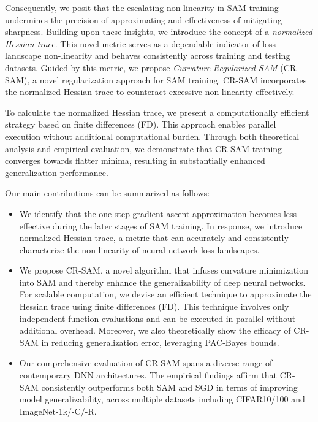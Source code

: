 \documentclass[letterpaper]{article} %
\theoremstyle{plain}
\theoremstyle{definition}
\begin{document}
Consequently, we posit that the escalating non-linearity in SAM training undermines the precision of approximating and effectiveness of mitigating sharpness. Building upon these insights, we introduce the concept of a {\em normalized Hessian trace}. This novel metric serves as a dependable indicator of loss landscape non-linearity and behaves consistently across training and testing datasets. Guided by this metric, we propose {\em Curvature Regularized SAM} (CR-SAM), a novel regularization approach for SAM training. CR-SAM incorporates the normalized Hessian trace to counteract excessive non-linearity effectively.

To calculate the normalized Hessian trace, we present a computationally efficient strategy based on finite differences (FD). This approach enables parallel execution without additional computational burden. Through both theoretical analysis and empirical evaluation, we demonstrate that CR-SAM training converges towards flatter minima, resulting in substantially enhanced generalization performance.

Our main contributions can be summarized as follows:
\begin{itemize}
    \item We identify that the one-step gradient ascent approximation becomes less effective during the later stages of SAM training. In response, we introduce normalized Hessian trace, a metric that can accurately and consistently characterize the non-linearity of neural network loss landscapes.

    \item We propose CR-SAM, a novel algorithm that infuses curvature minimization into SAM and thereby enhance the generalizability of deep neural networks. For scalable computation, we devise an efficient technique to approximate the Hessian trace using finite differences (FD). This technique involves only independent function evaluations and can be executed in parallel without additional overhead. Moreover, we also theoretically show the efficacy of CR-SAM in reducing generalization error, leveraging PAC-Bayes bounds.

    \item Our comprehensive evaluation of CR-SAM spans a diverse range of contemporary DNN architectures. The empirical findings affirm that CR-SAM consistently outperforms both SAM and SGD in terms of improving model generalizability, across multiple datasets including CIFAR10/100 and ImageNet-1k/-C/-R.
\end{itemize}
\end{document}
